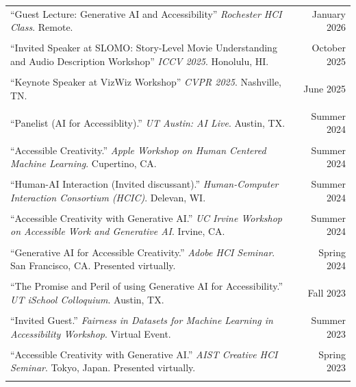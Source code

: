 \begin{longtable}{Xr}
	``Guest Lecture: Generative AI and Accessibility'' \textit{Rochester HCI Class}. Remote. & January 2026 \\
	\\

	``Invited Speaker at SLOMO: Story-Level Movie Understanding and Audio Description Workshop'' \textit{ICCV 2025}. Honolulu, HI. & October 2025 \\
	\\

	``Keynote Speaker at VizWiz Workshop'' \textit{CVPR 2025}. Nashville, TN. & June 2025 \\
	\\

	``Panelist (AI for Accessiblity).'' \textit{UT Austin: AI Live}. Austin, TX. & Summer 2024 \\
	\\

	``Accessible Creativity.'' \textit{Apple Workshop on Human Centered Machine Learning}. Cupertino, CA. & Summer 2024 \\
	\\

	``Human-AI Interaction (Invited discussant).'' \textit{Human-Computer Interaction Consortium (HCIC)}. Delevan, WI. & Summer 2024 \\
	\\

	``Accessible Creativity with Generative AI.'' \textit{UC Irvine Workshop on Accessible Work and Generative AI}. Irvine, CA. & Summer 2024 \\
	\\

	``Generative AI for Accessible Creativity.'' \textit{Adobe HCI Seminar}. San Francisco, CA. Presented virtually. & Spring 2024 \\
	\\

	``The Promise and Peril of using Generative AI for Accessibility.'' \textit{UT iSchool Colloquium}. Austin, TX. & Fall 2023 \\
	\\

	``Invited Guest.'' \textit{Fairness in Datasets for Machine Learning in Accessibility Workshop}. Virtual Event. & Summer 2023 \\
	\\

	``Accessible Creativity with Generative AI.'' \textit{AIST Creative HCI Seminar}. Tokyo, Japan. Presented virtually. & Spring 2023 \\
	\\


\end{longtable}
